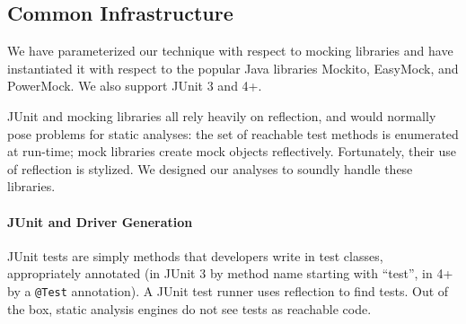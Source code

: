 

\subsection{Common Infrastructure}
\label{sec:common}
We have parameterized our technique with respect to mocking libraries and have instantiated it with respect to the popular Java libraries Mockito, EasyMock, and PowerMock. We also support JUnit 3 and 4+. %

JUnit and mocking libraries all rely heavily on reflection, and would normally pose problems for static analyses: the set of reachable test methods is enumerated at run-time; mock libraries create mock objects reflectively. Fortunately, their use of reflection is stylized. We designed our analyses to soundly handle these libraries.

\paragraph{JUnit and Driver Generation}
JUnit tests are simply methods that developers write in test classes, appropriately annotated (in JUnit 3 by method name starting with ``test'', in 4+ by a \texttt{@Test} annotation). A JUnit test runner uses reflection to find tests. Out of the box, static analysis engines do not see tests as reachable code.


